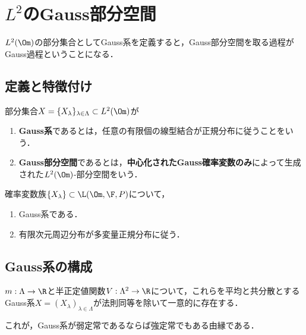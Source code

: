 \documentclass[uplatex,dvipdfmx]{jsreport}
\begin{document}
\section{$L^2$のGauss部分空間}

\begin{tcolorbox}[colframe=ForestGreen, colback=ForestGreen!10!white,breakable,colbacktitle=ForestGreen!40!white,coltitle=black,fonttitle=\bfseries\sffamily,
title=]
    $L^2(\Om)$の部分集合としてGauss系を定義すると，Gauss部分空間を取る過程がGauss過程ということになる．
\end{tcolorbox}

\subsection{定義と特徴付け}

\begin{definition}
    部分集合$X=\{X_\lambda\}_{\lambda\in\Lambda}\subset L^2(\Om)$が
    \begin{enumerate}
        \item \textbf{Gauss系}であるとは，任意の有限個の線型結合が正規分布に従うことをいう．
        \item \textbf{Gauss部分空間}であるとは，\textbf{中心化されたGauss確率変数のみ}によって生成された$L^2(\Om)$-部分空間をいう．
    \end{enumerate}
\end{definition}

\begin{theorem}[有限次元周辺分布による特徴付け]
    確率変数族$\{X_\lambda\}\subset\L(\Om,\F,P)$について，
    \begin{enumerate}
        \item Gauss系である．
        \item 有限次元周辺分布が多変量正規分布に従う．
    \end{enumerate}
\end{theorem}

\subsection{Gauss系の構成}

\begin{theorem}[平均と共分散による構成]
    $m:\Lambda\to\R$と半正定値関数$V:\Lambda^2\to\R$について，これらを平均と共分散とするGauss系$X=(X_\lambda)_{\lambda\in\Lambda}$が法則同等を除いて一意的に存在する．
\end{theorem}
\begin{remarks}
    これが，Gauss系が弱定常であるならば強定常でもある由縁である．
\end{remarks}
\end{document}
